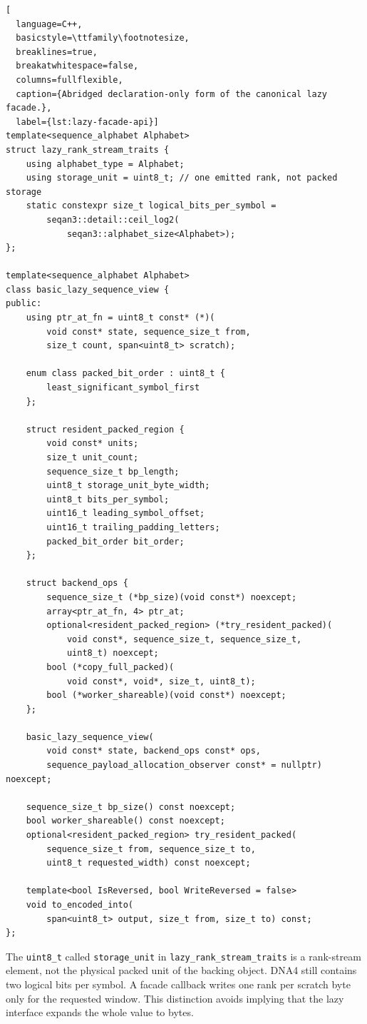 \begin{lstlisting}[
  language=C++,
  basicstyle=\ttfamily\footnotesize,
  breaklines=true,
  breakatwhitespace=false,
  columns=fullflexible,
  caption={Abridged declaration-only form of the canonical lazy facade.},
  label={lst:lazy-facade-api}]
template<sequence_alphabet Alphabet>
struct lazy_rank_stream_traits {
    using alphabet_type = Alphabet;
    using storage_unit = uint8_t; // one emitted rank, not packed storage
    static constexpr size_t logical_bits_per_symbol =
        seqan3::detail::ceil_log2(
            seqan3::alphabet_size<Alphabet>);
};

template<sequence_alphabet Alphabet>
class basic_lazy_sequence_view {
public:
    using ptr_at_fn = uint8_t const* (*)(
        void const* state, sequence_size_t from,
        size_t count, span<uint8_t> scratch);

    enum class packed_bit_order : uint8_t {
        least_significant_symbol_first
    };

    struct resident_packed_region {
        void const* units;
        size_t unit_count;
        sequence_size_t bp_length;
        uint8_t storage_unit_byte_width;
        uint8_t bits_per_symbol;
        uint16_t leading_symbol_offset;
        uint16_t trailing_padding_letters;
        packed_bit_order bit_order;
    };

    struct backend_ops {
        sequence_size_t (*bp_size)(void const*) noexcept;
        array<ptr_at_fn, 4> ptr_at;
        optional<resident_packed_region> (*try_resident_packed)(
            void const*, sequence_size_t, sequence_size_t,
            uint8_t) noexcept;
        bool (*copy_full_packed)(
            void const*, void*, size_t, uint8_t);
        bool (*worker_shareable)(void const*) noexcept;
    };

    basic_lazy_sequence_view(
        void const* state, backend_ops const* ops,
        sequence_payload_allocation_observer const* = nullptr) noexcept;

    sequence_size_t bp_size() const noexcept;
    bool worker_shareable() const noexcept;
    optional<resident_packed_region> try_resident_packed(
        sequence_size_t from, sequence_size_t to,
        uint8_t requested_width) const noexcept;

    template<bool IsReversed, bool WriteReversed = false>
    void to_encoded_into(
        span<uint8_t> output, size_t from, size_t to) const;
};
\end{lstlisting}

The \texttt{uint8\_t} called \texttt{storage\_unit} in
\texttt{lazy\_rank\_stream\_traits} is a rank-stream element, not the physical
packed unit of the backing object.  DNA4 still contains two logical bits per
symbol.  A facade callback writes one rank per scratch byte only for the
requested window.  This distinction avoids implying that the lazy interface
expands the whole value to bytes.

